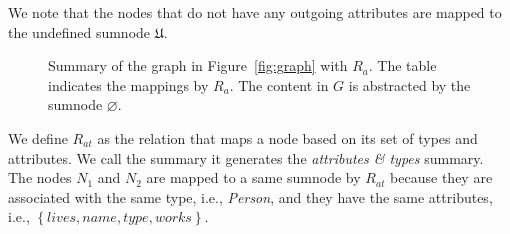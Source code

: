 \begin{remark}
We note that the nodes that do not have any outgoing attributes are mapped to the undefined sumnode $\mathfrak{U}$.
\end{remark}

\begin{figure}
	\centering
	\begin{minipage}{.75\textwidth}
		\resizebox{\textwidth}{!}{
			
		}
	\end{minipage}
	\quad
	\begin{minipage}[h]{.2\textwidth}
		\centering
		\caption*{$R_a\left(V, \mathcal{W}\right)$}
	\end{minipage}
	\caption{Summary of the graph in Figure~\ref{fig:graph} with $R_a$. The table indicates the mappings by $R_a$. The content in $G$ is abstracted by the sumnode $\varnothing$.}
	\label{fig:attributes-summary}
\end{figure}
\vspace{.5cm}


We define $R_{at}$ as the relation that maps a node based on its set of types and attributes. We call the summary it generates the \emph{attributes \& types} summary.
The nodes $N_1$ and $N_2$ are mapped to a same sumnode by $R_{at}$ because they are associated with the same type, i.e., \emph{Person}, and they have the same attributes, i.e., $\left\lbrace lives, name, type, works \right\rbrace$.

